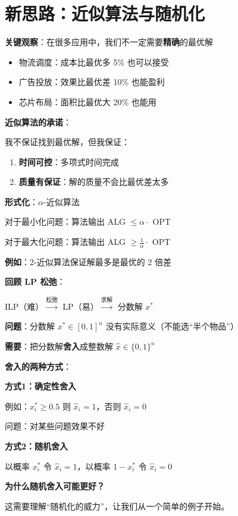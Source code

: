 \documentclass[12pt, a4paper]{ctexart}
\begin{document}
\section{新思路：近似算法与随机化}

\begin{blackboard}

\textbf{关键观察}：在很多应用中，我们不一定需要\textbf{精确}的最优解

\begin{itemize}
    \item 物流调度：成本比最优多 5\% 也可以接受
    \item 广告投放：效果比最优差 10\% 也能盈利
    \item 芯片布局：面积比最优大 20\% 也能用
\end{itemize}

\textbf{近似算法的承诺}：

我不保证找到最优解，但我保证：
\begin{enumerate}
    \item \textbf{时间可控}：多项式时间完成
    \item \textbf{质量有保证}：解的质量不会比最优差太多
\end{enumerate}

\textbf{形式化}：$\alpha$-近似算法

对于最小化问题：算法输出 ALG $\leq \alpha \cdot$ OPT

对于最大化问题：算法输出 ALG $\geq \frac{1}{\alpha} \cdot$ OPT

\textbf{例如}：2-近似算法保证解最多是最优的 2 倍差

\end{blackboard}

\begin{blackboard}[近似算法的设计思路]

\textbf{回顾 LP 松弛}：

ILP（难）$\xrightarrow{\text{松弛}}$ LP（易）$\xrightarrow{\text{求解}}$ 分数解 $x^*$

\textbf{问题}：分数解 $x^* \in [0, 1]^n$ 没有实际意义（不能选``半个物品''）

\textbf{需要}：把分数解\textbf{舍入}成整数解 $\hat{x} \in \{0, 1\}^n$

\textbf{舍入的两种方式}：

\textbf{方式1：确定性舍入}

例如：$x_i^* \geq 0.5$ 则 $\hat{x}_i = 1$，否则 $\hat{x}_i = 0$

问题：对某些问题效果不好

\textbf{方式2：随机舍入}

以概率 $x_i^*$ 令 $\hat{x}_i = 1$，以概率 $1 - x_i^*$ 令 $\hat{x}_i = 0$

\textbf{为什么随机舍入可能更好？}

这需要理解``随机化的威力''，让我们从一个简单的例子开始。

\end{blackboard}
\end{document}
